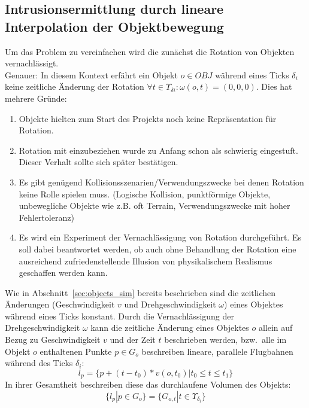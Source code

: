 

\subsection{Intrusionsermittlung durch lineare Interpolation der Objektbewegung}
\label{sec:linear_int}
Um das Problem zu vereinfachen wird die zunächst die Rotation von Objekten vernachlässigt.\\
Genauer: In diesem Kontext erfährt ein Objekt $o\in OBJ$ während eines Ticks $\delta_i$ keine zeitliche Änderung der Rotation $\forall t \in \Upsilon_{\delta i} : \omega(o, t) = (0,0,0)$. Dies hat mehrere Gründe:
\begin{enumerate}
\item Objekte hielten zum Start des Projekts noch keine Repräsentation für Rotation.
\item Rotation mit einzubeziehen wurde zu Anfang schon als schwierig eingestuft. Dieser Verhalt sollte sich später bestätigen.
\item Es gibt genügend Kollisionsszenarien/Verwendungszwecke bei denen Rotation keine Rolle spielen muss. (Logische Kollision, punktförmige Objekte, unbewegliche Objekte wie z.B. oft Terrain, Verwendungszwecke mit hoher Fehlertoleranz)
\item Es wird ein Experiment der Vernachlässigung von Rotation durchgeführt. Es soll dabei beantwortet werden, ob auch ohne Behandlung der Rotation eine ausreichend zufriedenstellende Illusion von physikalischem Realismus geschaffen werden kann.
\end{enumerate}

Wie in Abschnitt~\ref{sec:objects_sim} bereits beschrieben sind die zeitlichen Änderungen (Geschwindigkeit $v$ und Drehgeschwindigkeit $\omega$) eines Objektes während eines Ticks konstant. Durch die Vernachlässigung der Drehgeschwindigkeit $\omega$ kann die zeitliche Änderung eines Objektes $o$ allein auf Bezug zu Geschwindigkeit $v$ und der Zeit $t$ beschrieben werden, bzw.~alle im Objekt $o$ enthaltenen Punkte $p \in G_o$ beschreiben lineare, parallele Flugbahnen während des Ticks $\delta_i$:
$$l_p = \{p + (t - t_0) * v(o, t_0) | t_0 \leq t \leq t_1\}$$
In ihrer Gesamtheit beschreiben diese das durchlaufene Volumen des Objekts:
$$\{l_p|p\in G_o\} = \{G_{o, t}| t \in \Upsilon_{\delta_i}\}$$


